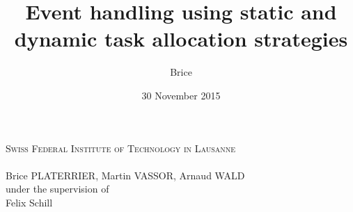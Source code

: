 \documentclass[a4paper,12pt,twoside]{report}
\title{Event handling using static and dynamic
task allocation strategies}
\author{Brice \bsc{Platerrier}}
\date{30 November 2015}
\begin{document}
\makeatletter

  \begin{titlepage}
  \pagestyle{empty}
  \centering
      {\large \textsc{Swiss Federal Institute of Technology in Lausanne}}\\
    \vspace{5cm}
       {\LARGE \textbf{\@title}} \\
    \vfill
        {\large Brice PLATERRIER, Martin VASSOR, Arnaud WALD} \\
		\vspace{1em}
				{\normalsize under the supervision of}\\
		\vspace{1em}
				{\large Felix Schill}\\
		\vfill
    {\large \@date}\\
  \end{titlepage}
\makeatother


\setcounter{page}{1}
\thispagestyle{empty}
\tableofcontents
\restoregeometry
\cleardoublepage

\pagestyle{fancy}
\setcounter{page}{1}






\printbibliography
\end{document}
